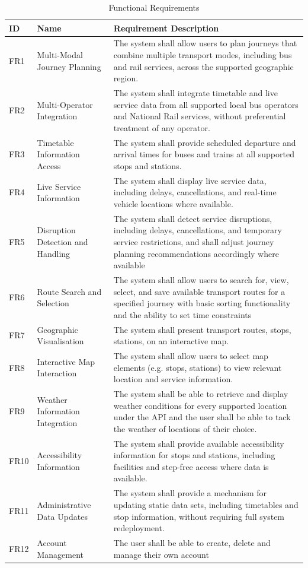 \documentclass{article}
\begin{document}
\begin{table}[H]
\centering
\renewcommand{\arraystretch}{1.3}
\begin{tabular}{|p{1cm}|p{4cm}|p{12cm}|}
\hline
\textbf{ID} & \textbf{Name} & \textbf{Requirement Description} \\
\hline
FR1 & Multi-Modal Journey Planning &
The system shall allow users to plan journeys that combine multiple transport modes, including bus and rail services, across the supported geographic region. \\
\hline
FR2 & Multi-Operator Integration &
The system shall integrate timetable and live service data from all supported local bus operators and National Rail services, without preferential treatment of any operator. \\
\hline
FR3 & Timetable Information Access &
The system shall provide scheduled departure and arrival times for buses and trains at all supported stops and stations. \\
\hline
FR4 & Live Service Information &
The system shall display live service data, including delays, cancellations, and real-time vehicle locations where available. \\
\hline
FR5 & Disruption Detection and Handling &
The system shall detect service disruptions, including delays, cancellations, and temporary service restrictions, and shall adjust journey planning recommendations accordingly where available \\
\hline
FR6 & Route Search and Selection &
The system shall allow users to search for, view, select, and save available transport routes for a specified journey with basic sorting functionality and the ability to set time constraints\\
\hline
FR7 & Geographic Visualisation &
The system shall present transport routes, stops, stations, on an interactive map. \\
\hline
FR8 & Interactive Map Interaction &
The system shall allow users to select map elements (e.g. stops, stations) to view relevant location and service information. \\
\hline
FR9 & Weather Information Integration &
The system shall be able to retrieve and display weather conditions for every supported location under the API and the user shall be able to tack the weather of locations of their choice. \\
\hline
FR10 & Accessibility Information &
The system shall provide available accessibility information for stops and stations, including facilities and step-free access where data is available. \\
\hline
FR11 & Administrative Data Updates &
The system shall provide a mechanism for updating static data sets, including timetables and stop information, without requiring full system redeployment. \\
\hline
FR12 & Account Management & The user shall be able to create, delete and manage their own account \\
\hline

\end{tabular}
\caption{Functional Requirements}
\end{table}
\end{document}
